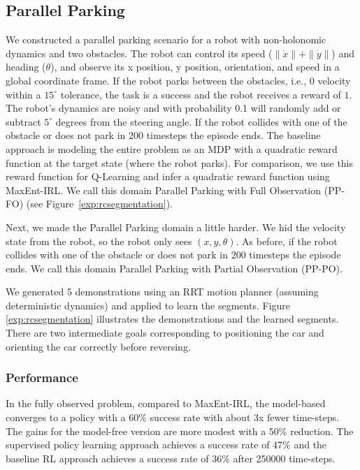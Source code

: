 \subsection{Parallel Parking}\label{exp:pp}
We constructed a parallel parking scenario for a robot with non-holonomic dynamics and two obstacles. The robot can control its speed ($\|\dot{x}\|+\|\dot{y}\|$) and heading ($\theta$), and observe its x position, y position, orientation, and speed in a global coordinate frame.
If the robot parks between the obstacles, i.e., 0 velocity within a $15^\circ$ tolerance, the task is a success and the robot receives a reward of $1$. 
The robot's dynamics are noisy and with probability 0.1 will randomly add or subtract $5^\circ$ degrees from the steering angle.
If the robot collides with one of the obstacle or does not park in 200 timesteps the episode ends. 
The baseline approach is modeling the entire problem as an MDP with a quadratic reward function at the target state (where the robot parks).
For comparison, we use this reward function for Q-Learning and infer a quadratic reward function using MaxEnt-IRL.
We call this domain Parallel Parking with Full Observation (PP-FO) (see Figure~\ref{exp:rcsegmentation}).

Next, we made the  Parallel Parking domain a little harder. We hid the velocity state from the robot, so the robot only sees $(x,y,\theta)$. As before, if the robot collides with one of the obstacle or does not park in 200 timesteps the episode ends.
We call this domain Parallel Parking with Partial Observation (PP-PO).

We generated 5 demonstrations using an RRT motion planner (assuming deterministic dynamics) and applied \hirl to learn the segments.
Figure \ref{exp:rcsegmentation} illustrates the demonstrations and the learned segments. There are two intermediate goals corresponding to positioning the car and orienting the car correctly before reversing.

\vspace{-15pt}
\subsubsection{Performance}\label{exp:ppc} 
In the fully observed problem, compared to MaxEnt-IRL, the model-based \hirl converges to a policy with a 60\% success rate with about 3x fewer time-steps.
The gains for the model-free version are more modest with a 50\% reduction.
The supervised policy learning approach achieves a success rate of 47\% and the baseline RL approach achieves a success rate of 36\% after 250000 time-steps.

